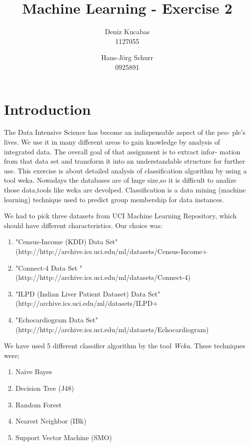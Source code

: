 \documentclass[a4paper]{article}
\begin{document}
\title{Machine Learning - Exercise 2 }
\author{
        Deniz Kucabas \\ 
                     1127055 
                    \and
                    Hans-Jörg Schurr \\ 0925891
}

\maketitle
\tableofcontents
\newpage

\section{Introduction}
The Data Intensive Science has become an indispensable aspect of the peo- ple's
lives. We use it in many different areas to gain knowledge by analysis
of integrated data. The overall goal of that assignment is to extract infor-
mation from that data set and transform it into an understandable structure
for further use. This exercise is about detailed analysis of classification
algorithm by using a tool weka.  Nowadays the databases are of huge size,so it
is difficult to analize those data,tools like weka are 
devolped. Classification is a data mining (machine learning) technique used 
to predict group membership for data instances. 

We had to pick three datasets from UCI Machine Learning Repository, which
should have different characteristics.  Our choice was:
\begin{enumerate}
    \item "Census-Income (KDD) Data Set" \\ 
(http://http://archive.ics.uci.edu/ml/datasets/Census-Income+%
    \item "Connect-4 Data Set " \\
        (http://http://archive.ics.uci.edu/ml/datasets/Connect-4)
    \item "ILPD (Indian Liver Patient Dataset) Data Set"\\
        (http://archive.ics.uci.edu/ml/datasets/ILPD+%
    \item "Echocardiogram  Data Set" \\
        (http://http://archive.ics.uci.edu/ml/datasets/Echocardiogram)
\end{enumerate}

We have used 5 different classifier algorithm by the tool \emph{Weka}. 
These techniques were;
\begin{enumerate}
    \item Naive Bayes
    \item Decision Tree (J48)
    \item Random Forest
    \item Nearest Neighbor (IBk)
    \item Support Vector Machine (SMO)
\end{enumerate}
\end{document}
